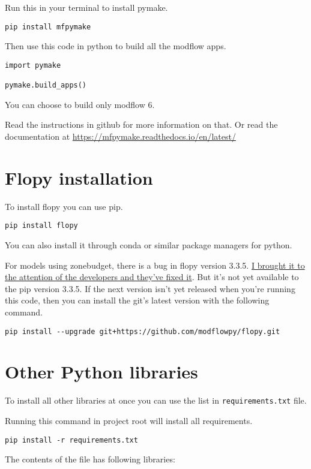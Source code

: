 \documentclass[titlepage,12pt]{unisubmission}
\begin{document}
Run this in your terminal to install pymake.
\begin{verbatim}
pip install mfpymake  
\end{verbatim}

Then use this code in python to build all the modflow apps.
\begin{verbatim}
import pymake

pymake.build_apps()
\end{verbatim}

You can choose to build only modflow 6.

Read the instructions in github for more information on that. Or read the documentation at \url{https://mfpymake.readthedocs.io/en/latest/}

\section{Flopy installation}
\label{sec:org2b1677f}
To install flopy you can use pip.
\begin{verbatim}
pip install flopy
\end{verbatim}

You can also install it through conda or similar package managers for python.

For models using zonebudget, there is a bug in flopy version 3.3.5. \href{https://github.com/modflowpy/flopy/issues/1395}{I brought it to the attention of the developers and they've fixed it}. But it's not yet available to the pip version 3.3.5. If the next version isn't yet released when you're running this code, then you can install the git's latest version with the following command.

\begin{verbatim}
pip install --upgrade git+https://github.com/modflowpy/flopy.git
\end{verbatim}


\section{Other Python libraries}
\label{sec:org0080776}
To install all other libraries at once you can use the list in \texttt{requirements.txt} file.

Running this command in project root will install all requirements.
\begin{verbatim}
pip install -r requirements.txt
\end{verbatim}

The contents of the file has following libraries:
\end{document}
